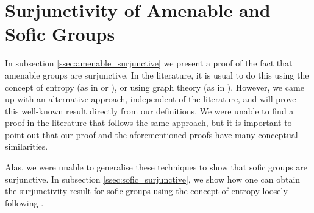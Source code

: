 \documentclass[titlepage, a4paper]{article}
\theoremstyle{definition}
\theoremstyle{remark}
\begin{document}
	
\section{Surjunctivity of Amenable and Sofic Groups}

In subsection \ref{ssec:amenable_surjunctive} we present a proof of the fact that amenable groups are surjunctive. In the literature, it is usual to do this using the concept of entropy (as in \cite[section 4]{kerr_li_2010} or \cite[subsection 2.13]{capraro_lupini_2015}), or using graph theory (as in \cite[section 3]{weiss_2000}). However, we came up with an alternative approach, independent of the literature, and will prove this well-known result directly from our definitions. We were unable to find a proof in the literature that follows the same approach, but it is important to point out that our proof and the aforementioned proofs have many conceptual similarities. 

Alas, we were unable to generalise these techniques to show that sofic groups are surjunctive. In subsection \ref{ssec:sofic_surjunctive}, we show how one can obtain the surjunctivity result for sofic groups using the concept of entropy loosely following \cite[paragraph 2.13.6 - 2.13.7]{capraro_lupini_2015}.
\end{document}
